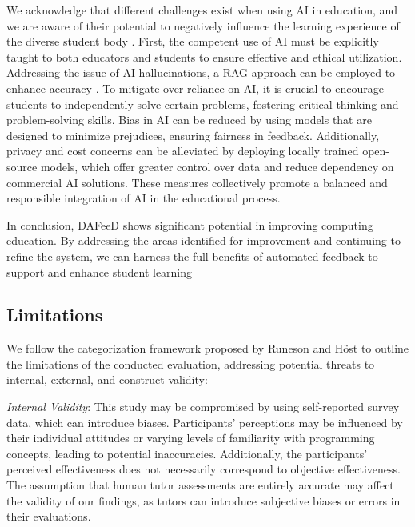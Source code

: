 \documentclass[sigconf,screen,review,anonymous]{acmart}
\begin{document}
We acknowledge that different challenges exist when using AI in education, and we are aware of their potential to negatively influence the learning experience of the diverse student body \cite{kasneci:2023:ChatGPTGoodOpportunitiesa}.
First, the competent use of AI must be explicitly taught to both educators and students to ensure effective and ethical utilization.
Addressing the issue of AI hallucinations, a RAG approach can be employed to enhance accuracy \cite{gao:2024:RetrievalAugmentedGenerationLarge}.
To mitigate over-reliance on AI, it is crucial to encourage students to independently solve certain problems, fostering critical thinking and problem-solving skills.
Bias in AI can be reduced by using models that are designed to minimize prejudices, ensuring fairness in feedback.
Additionally, privacy and cost concerns can be alleviated by deploying locally trained open-source models, which offer greater control over data and reduce dependency on commercial AI solutions.
These measures collectively promote a balanced and responsible integration of AI in the educational process.

In conclusion, DAFeeD shows significant potential in improving computing education.
By addressing the areas identified for improvement and continuing to refine the system, we can harness the full benefits of automated feedback to support and enhance student learning


\subsection{Limitations}
We follow the categorization framework proposed by Runeson and Höst \cite{runeson:2009:GuidelinesConductingReporting} to outline the limitations of the conducted evaluation, addressing potential threats to internal, external, and construct validity:

\textit{Internal Validity}: This study may be compromised by using self-reported survey data, which can introduce biases. 
Participants' perceptions may be influenced by their individual attitudes or varying levels of familiarity with programming concepts, leading to potential inaccuracies.
Additionally, the participants' perceived effectiveness does not necessarily correspond to objective effectiveness.
The assumption that human tutor assessments are entirely accurate may affect the validity of our findings, as tutors can introduce subjective biases or errors in their evaluations.
\end{document}

